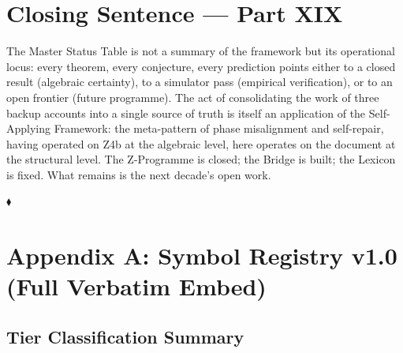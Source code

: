 \documentclass[12pt, a4paper]{article}
\begin{document}
\section{Closing Sentence — Part XIX}
\label{sec:xix-closing}

The Master Status Table is not a summary of the framework but its
operational locus: every theorem, every conjecture, every prediction
points either to a closed result (algebraic certainty), to a
simulator pass (empirical verification), or to an open frontier
(future programme). The act of consolidating the work of three
backup accounts into a single source of truth is itself an
application of the Self-Applying Framework: the meta-pattern of
phase misalignment and self-repair, having operated on Z4b at the
algebraic level, here operates on the document at the structural
level. The Z-Programme is closed; the Bridge is built; the Lexicon
is fixed. What remains is the next decade's open work.

\noindent\hfill$\blacklozenge$



\appendix

\section{Appendix A: Symbol Registry v1.0 (Full Verbatim Embed)}
\label{app:symbol-registry}

\subsection{Tier Classification Summary}
\end{document}
